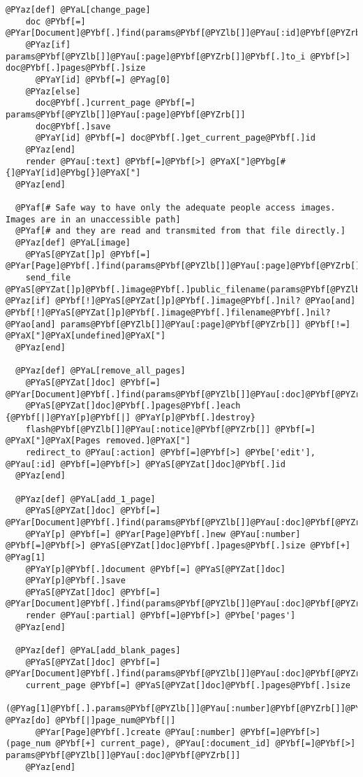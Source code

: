 \begin{Verbatim}[commandchars=@\[\]]
  @PYaz[def] @PYaL[change_page]
    doc @PYbf[=] @PYar[Document]@PYbf[.]find(params@PYbf[@PYZlb[]]@PYau[:id]@PYbf[@PYZrb[]])
    @PYaz[if] params@PYbf[@PYZlb[]]@PYau[:page]@PYbf[@PYZrb[]]@PYbf[.]to_i @PYbf[>] doc@PYbf[.]pages@PYbf[.]size
      @PYaY[id] @PYbf[=] @PYag[0]
    @PYaz[else]
      doc@PYbf[.]current_page @PYbf[=] params@PYbf[@PYZlb[]]@PYau[:page]@PYbf[@PYZrb[]]
      doc@PYbf[.]save
      @PYaY[id] @PYbf[=] doc@PYbf[.]get_current_page@PYbf[.]id
    @PYaz[end]
    render @PYau[:text] @PYbf[=]@PYbf[>] @PYaX["]@PYbg[#{]@PYaY[id]@PYbg[}]@PYaX["]
  @PYaz[end]
  
  @PYaf[# Safe way to have only the adequate people access images. Images are in an unaccessible path]
  @PYaf[# and they are read and transmited from that file directly.]
  @PYaz[def] @PYaL[image]
    @PYaS[@PYZat[]p] @PYbf[=] @PYar[Page]@PYbf[.]find(params@PYbf[@PYZlb[]]@PYau[:page]@PYbf[@PYZrb[]])
    send_file @PYaS[@PYZat[]p]@PYbf[.]image@PYbf[.]public_filename(params@PYbf[@PYZlb[]]@PYau[:thumb]@PYbf[@PYZrb[]]) @PYaz[if] @PYbf[!]@PYaS[@PYZat[]p]@PYbf[.]image@PYbf[.]nil? @PYao[and] @PYbf[!]@PYaS[@PYZat[]p]@PYbf[.]image@PYbf[.]filename@PYbf[.]nil? @PYao[and] params@PYbf[@PYZlb[]]@PYau[:page]@PYbf[@PYZrb[]] @PYbf[!=] @PYaX["]@PYaX[undefined]@PYaX["]
  @PYaz[end]

  @PYaz[def] @PYaL[remove_all_pages]
    @PYaS[@PYZat[]doc] @PYbf[=] @PYar[Document]@PYbf[.]find(params@PYbf[@PYZlb[]]@PYau[:doc]@PYbf[@PYZrb[]])
    @PYaS[@PYZat[]doc]@PYbf[.]pages@PYbf[.]each {@PYbf[|]@PYaY[p]@PYbf[|] @PYaY[p]@PYbf[.]destroy}
    flash@PYbf[@PYZlb[]]@PYau[:notice]@PYbf[@PYZrb[]] @PYbf[=] @PYaX["]@PYaX[Pages removed.]@PYaX["]
    redirect_to @PYau[:action] @PYbf[=]@PYbf[>] @PYbe['edit'], @PYau[:id] @PYbf[=]@PYbf[>] @PYaS[@PYZat[]doc]@PYbf[.]id
  @PYaz[end]
  
  @PYaz[def] @PYaL[add_1_page]
    @PYaS[@PYZat[]doc] @PYbf[=] @PYar[Document]@PYbf[.]find(params@PYbf[@PYZlb[]]@PYau[:doc]@PYbf[@PYZrb[]])
    @PYaY[p] @PYbf[=] @PYar[Page]@PYbf[.]new @PYau[:number] @PYbf[=]@PYbf[>] @PYaS[@PYZat[]doc]@PYbf[.]pages@PYbf[.]size @PYbf[+] @PYag[1]
    @PYaY[p]@PYbf[.]document @PYbf[=] @PYaS[@PYZat[]doc]
    @PYaY[p]@PYbf[.]save
    @PYaS[@PYZat[]doc] @PYbf[=] @PYar[Document]@PYbf[.]find(params@PYbf[@PYZlb[]]@PYau[:doc]@PYbf[@PYZrb[]])
    render @PYau[:partial] @PYbf[=]@PYbf[>] @PYbe['pages']
  @PYaz[end]
  
  @PYaz[def] @PYaL[add_blank_pages]
    @PYaS[@PYZat[]doc] @PYbf[=] @PYar[Document]@PYbf[.]find(params@PYbf[@PYZlb[]]@PYau[:doc]@PYbf[@PYZrb[]])
    current_page @PYbf[=] @PYaS[@PYZat[]doc]@PYbf[.]pages@PYbf[.]size
    (@PYag[1]@PYbf[.].params@PYbf[@PYZlb[]]@PYau[:number]@PYbf[@PYZrb[]]@PYbf[.]to_i)@PYbf[.]each @PYaz[do] @PYbf[|]page_num@PYbf[|]
      @PYar[Page]@PYbf[.]create @PYau[:number] @PYbf[=]@PYbf[>] (page_num @PYbf[+] current_page), @PYau[:document_id] @PYbf[=]@PYbf[>] params@PYbf[@PYZlb[]]@PYau[:doc]@PYbf[@PYZrb[]]
    @PYaz[end]


\end{Verbatim}
